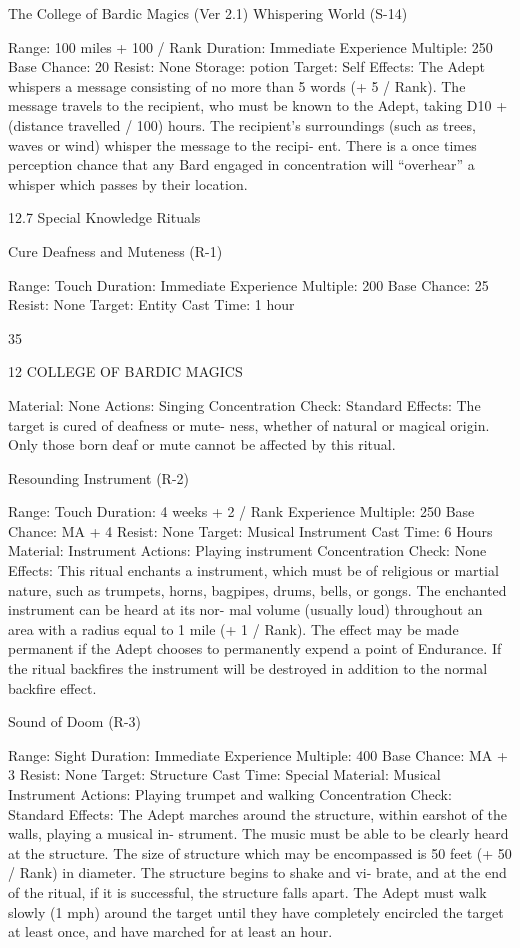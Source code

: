 \begin{Chapter}{The College of Bardic Magics (Ver 2.1)}
Whispering World (S-14) 

Range: 100 miles + 100 / Rank 
Duration: Immediate 
Experience Multiple: 250 
Base Chance: 20%
Resist: None 
Storage: potion 
Target: Self 
Effects:  The  Adept  whispers  a  message  consisting 
of no more than 5 words (+ 5 / Rank). The message 
travels to the recipient, who must be known to the 
Adept,  taking  D10  +  (distance  travelled  /  100) 
hours.  The  recipient’s  surroundings  (such  as trees, 
waves or  wind) whisper the message to the recipi-
ent.  There  is  a  once  times  perception  chance  that 
any Bard engaged in concentration will “overhear” 
a whisper which passes by their location. 

12.7 Special Knowledge Rituals  

Cure Deafness and Muteness (R-1)  

Range: Touch 
Duration: Immediate 
Experience Multiple: 200 
Base Chance: 25%
Resist: None 
Target: Entity 
Cast Time: 1 hour 

35 

12 COLLEGE OF BARDIC MAGICS 

Material: None 
Actions: Singing 
Concentration Check: Standard 
Effects:  The  target  is  cured  of  deafness  or  mute-
ness,  whether  of  natural  or  magical  origin.  Only 
those born deaf or mute cannot be affected by this 
ritual. 

Resounding Instrument (R-2) 

Range: Touch 
Duration: 4 weeks + 2 / Rank 
Experience Multiple: 250 
Base Chance: MA + 4%
Resist: None 
Target: Musical Instrument 
Cast Time: 6 Hours 
Material: Instrument 
Actions: Playing instrument  
Concentration Check: None 
Effects:  This  ritual  enchants  a  instrument,  which 
must  be  of  religious  or  martial  nature,  such  as 
trumpets,  horns,  bagpipes,  drums,  bells,  or  gongs. 
The  enchanted  instrument  can  be  heard  at  its  nor-
mal volume (usually loud) throughout an area with 
a  radius  equal  to  1  mile  (+  1  /  Rank).  The  effect 
may  be  made  permanent  if  the  Adept  chooses  to 
permanently  expend  a  point  of  Endurance.  If  the 
ritual backfires the instrument will be destroyed in 
addition to the normal backfire effect. 

Sound of Doom (R-3) 

Range: Sight 
Duration: Immediate 
Experience Multiple: 400 
Base Chance: MA + 3%
Resist: None 
Target: Structure 
Cast Time: Special 
Material: Musical Instrument 
Actions: Playing trumpet and walking 
Concentration Check: Standard 
Effects:  The  Adept  marches  around  the  structure, 
within  earshot  of  the  walls,  playing  a  musical  in-
strument.  The  music  must  be  able  to  be  clearly 
heard  at  the  structure.  The  size  of  structure  which 
may  be  encompassed  is  50  feet  (+  50  /  Rank)  in 
diameter.  The  structure  begins  to  shake  and  vi-
brate, and at the end of the ritual, if it is successful, 
the  structure  falls  apart.  The  Adept  must  walk 
slowly  (1  mph)  around  the  target  until  they  have 
completely  encircled  the  target  at  least  once,  and 
have marched for at least an hour. 


\end{Chapter}
